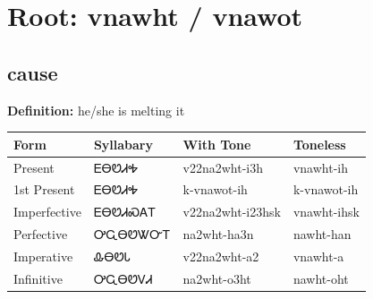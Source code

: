 \documentclass{article}%
\begin{document}
%
\normalsize%
\section*{Root: vnawht / vnawot}%
\subsection*{cause}%
\textbf{Definition: }%
he/she is melting it%
\\[0.5em]%
\begin{tabular}{|l|l|l|l|}%
\hline%
\textbf{Form}&\textbf{Syllabary}&\textbf{With Tone}&\textbf{Toneless}\\%
\hline%
Present&ᎬᎾᏬᏗᎭ&v22na2wht{-}i3h&vnawht{-}ih\\%
1st Present&ᎬᎾᏬᏗᎭ&k{-}vnawot{-}ih&k{-}vnawot{-}ih\\%
Imperfective&ᎬᎾᏬᏗᏍᎪᎢ&v22na2wht{-}i23hsk&vnawht{-}ihsk\\%
Perfective&ᎤᏩᎾᏬᏔᏅᎢ&na2wht{-}ha3n&nawht{-}han\\%
Imperative&ᎲᎾᏬᏓ&v22na2wht{-}a2&vnawht{-}a\\%
Infinitive&ᎤᏩᎾᏬᏙᏗ&na2wht{-}o3ht&nawht{-}oht\\%
\hline%
\end{tabular}%
\\[1em]%
\end{document}
